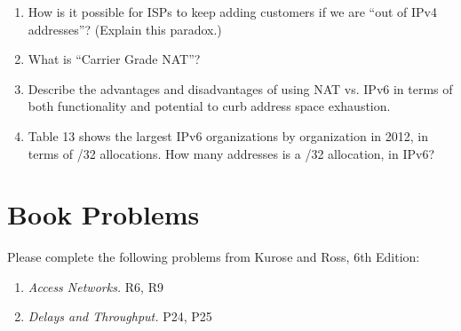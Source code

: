 \documentclass[11pt]{article}
\begin{document}
\begin{enumerate}
\item How is it possible for ISPs to keep adding customers if we are
  ``out of IPv4 addresses''?  (Explain this paradox.)
\item What is ``Carrier Grade NAT''?
\item Describe the advantages and disadvantages of using NAT vs. IPv6 in
  terms of both functionality and potential to curb address space
  exhaustion.
\item Table 13 shows the largest IPv6 organizations by organization in
  2012, in terms of /32 allocations.  How many addresses is a /32
  allocation, in IPv6?  
\end{enumerate}


\section{Book Problems}

Please complete the following problems from Kurose and Ross, 6th
Edition:

\begin{enumerate}
\itemsep=-1pt
\item {\em Access Networks.} R6, R9
\item {\em Delays and Throughput.} P24, P25

\end{enumerate}
\end{document}
